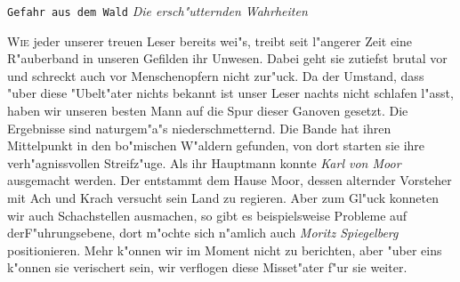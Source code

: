 \texttt{\Huge Gefahr aus dem Wald}
	\newline
\textit{\Large Die ersch"utternden Wahrheiten}
\normalsize

\begin{adjmulticols*}{3}{0pt}{0in}
 	\lettrine{W}{ie} jeder unserer treuen Leser bereits wei"s, treibt seit l"angerer Zeit eine R"auberband in unseren Gefilden ihr Unwesen. Dabei geht sie zutiefst brutal vor und schreckt auch vor Menschenopfern nicht zur"uck.
 	Da der Umstand, dass "uber diese "Ubelt"ater nichts bekannt ist unser Leser nachts nicht schlafen l"asst, haben wir unseren besten Mann auf die Spur dieser Ganoven gesetzt. Die Ergebnisse sind naturgem"a"s niederschmetternd.
 	Die Bande hat ihren Mittelpunkt in den bo"mischen W"aldern gefunden, von dort starten sie ihre verh"agnissvollen Streifz"uge. Als ihr Hauptmann konnte \textit{Karl von Moor} ausgemacht werden. Der entstammt dem Hause Moor, dessen alternder Vorsteher mit Ach und Krach versucht sein Land zu regieren.
 	Aber zum Gl"uck konneten wir auch Schachstellen ausmachen, so gibt es beispielsweise Probleme auf derF"uhrungsebene, dort m"ochte sich n"amlich auch \textit{Moritz Spiegelberg} positionieren.
 	Mehr k"onnen wir im Moment nicht zu berichten, aber "uber eins k"onnen sie verischert sein, wir verflogen diese Misset"ater f"ur sie weiter.
\end{adjmulticols*}